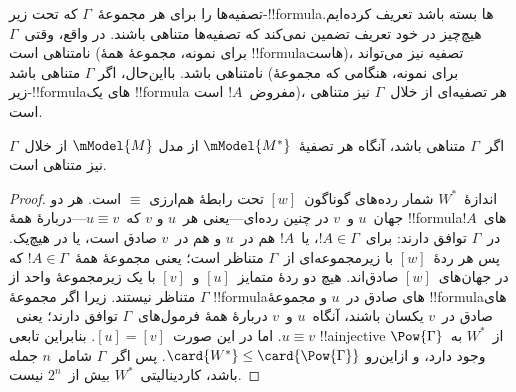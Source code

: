 \documentclass[../../../include/open-logic-section]{subfiles}
\begin{document}


تصفیه‌ها را برای هر مجموعهٔ~$\Gamma$ که تحت زیر-!!{formula}ها بسته
باشد تعریف کرده‌ایم. هیچ‌چیز در خود تعریف تضمین نمی‌کند که تصفیه‌ها
متناهی باشند. در واقع، وقتی~$\Gamma$ نامتناهی است (برای نمونه، مجموعهٔ
همهٔ !!{formula}هاست)، تصفیه نیز می‌تواند نامتناهی باشد. بااین‌حال، اگر
$\Gamma$ متناهی باشد (برای نمونه، هنگامی که مجموعهٔ زیر-!!{formula}های
یک !!{formula} مفروض~$!A$ است)، هر تصفیه‌ای از خلال~$\Gamma$ نیز
متناهی است.

\begin{prop}
  اگر~$\Gamma$ متناهی باشد، آنگاه هر تصفیهٔ~$\mModel{M^*}$ از مدل
  $\mModel{M}$ از خلال~$\Gamma$ نیز متناهی است.
\end{prop}

\begin{proof}
  اندازهٔ~$W^*$ شمار رده‌های گوناگون~$[w]$ تحت رابطهٔ هم‌ارزی
  $\equiv$ است. هر دو جهان~$u$ و~$v$ در چنین رده‌ای---یعنی هر~$u$ و
  $v$ که~$u \equiv v$---دربارهٔ همهٔ !!{formula}های~$!A$ در~$\Gamma$
  توافق دارند: برای~$!A \in \Gamma$، یا~$!A$ هم در~$u$ و هم در~$v$
  صادق است، یا در هیچ‌یک. پس هر ردهٔ~$[w]$ با زیرمجموعه‌ای از~$\Gamma$
  متناظر است؛ یعنی مجموعهٔ همهٔ~$!A \in \Gamma$ که در جهان‌های~$[w]$
  صادق‌اند. هیچ دو ردهٔ متمایز~$[u]$ و~$[v]$ با یک زیرمجموعهٔ واحد از
  $\Gamma$ متناظر نیستند. زیرا اگر مجموعهٔ !!{formula}های صادق در~$u$
  و مجموعهٔ !!{formula}های صادق در~$v$ یکسان باشند، آنگاه~$u$ و~$v$
  دربارهٔ همهٔ فرمول‌های~$\Gamma$ توافق دارند؛ یعنی~$u \equiv v$.
  اما در این صورت~$[u] = [v]$. بنابراین تابعی !!a{injective} از~$W^*$
  به~$\Pow{\Gamma}$ وجود دارد، و ازاین‌رو
  $\card{W^*} \le \card{\Pow{\Gamma}}$. پس اگر~$\Gamma$ شامل~$n$
  جمله باشد، کاردینالیتی~$W^*$ بیش از~$2^n$ نیست.
\end{proof}
\end{document}
